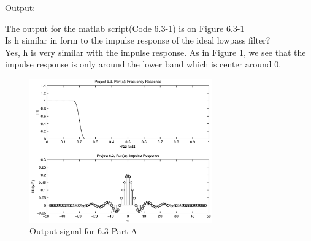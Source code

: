 {\LARGE Output:}\newline

The output for the matlab script(Code 6.3-1) is on Figure 6.3-1 \\

Is h similar in form to the impulse response of the ideal lowpass filter?\\

Yes, h is very similar with the impulse response. As in Figure 1, we see that the impulse response is only around the lower band which is center around 0.\\

\begin{figure}[!h]
  \centering
    \includegraphics[width=0.7\textwidth]{Part2/Output/Figures/proj63PartA.eps}
  \caption{Output signal for 6.3 Part A}
\end{figure}
\pagebreak
